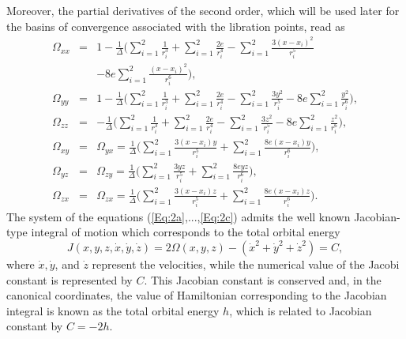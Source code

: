 \documentclass[preprint,fleqn,5p,numbers,sort&compress]{elsarticle}
\begin{document}
Moreover, the partial derivatives of the second order, which will be used later for the  basins of convergence associated with the libration points, read as
\begin{subequations}
\begin{eqnarray}\label{Eq:4a}
\Omega_{xx} &=& 1-\frac{1}{\Delta}\Big(\sum_{i=1}^2\frac{1}{r_i^3}+\sum_{i=1}^2\frac{2e}{r_i^4}-\sum_{i=1}^2\frac{3(x-x_i)^2}{r_i^5}\nonumber\\
  &&-8e\sum_{i=1}^2\frac{(x-x_i)^2}{r_i^6}\Big),\\
\label{Eq:4b}
\Omega_{yy} &=& 1-\frac{1}{\Delta}\Big(\sum_{i=1}^2\frac{1}{r_i^3}+\sum_{i=1}^2\frac{2e}{r_i^4}-\sum_{i=1}^2\frac{3y^2}{r_i^5}-8e\sum_{i=1}^2\frac{y^2}{r_i^6}\Big),\\
\label{Eq:4c}
\Omega_{zz} &=&-\frac{1}{\Delta}\Big(\sum_{i=1}^2\frac{1}{r_i^3}+\sum_{i=1}^2\frac{2e}{r_i^4}-\sum_{i=1}^2\frac{3z^2}{r_i^5}-8e\sum_{i=1}^2\frac{z^2}{r_i^6}\Big),\\
\label{Eq:4d}
\Omega_{xy} &=&\Omega_{yx} =\frac{1}{\Delta}\Big(\sum_{i=1}^2\frac{3(x-x_i)y}{r_i^5}+\sum_{i=1}^2\frac{8e(x-x_i)y}{r_i^6}\Big),\\
\label{Eq:4e}
\Omega_{yz} &=& \Omega_{zy} =\frac{1}{\Delta}\Big(\sum_{i=1}^2\frac{3yz}{r_i^5}+\sum_{i=1}^2\frac{8eyz}{r_i^6}\Big),\\
\label{Eq:4f}
\Omega_{zx} &=&\Omega_{zx}= \frac{1}{\Delta}\Big(\sum_{i=1}^2\frac{3(x-x_i)z}{r_i^5}+\sum_{i=1}^2\frac{8e(x-x_i)z}{r_i^6}\Big).
\end{eqnarray}
\end{subequations}
The system of the equations (\ref{Eq:2a},...,\ref{Eq:2c}) admits the well known Jacobian-type integral of motion which corresponds to the total orbital energy
\begin{equation}\label{Eq:9}
J(x, y, z, \dot{x}, \dot{y}, \dot{z})=2\Omega(x, y, z)-(\dot{x}^2+\dot{y}^2+\dot{z}^2) =C,
\end{equation}
where $\dot{x}, \dot{y}$, and $\dot{z}$  represent the velocities, while the numerical value of the Jacobi constant is represented by $C$. This Jacobian constant is conserved and, in the canonical coordinates, the value of Hamiltonian corresponding to the Jacobian integral is known as the total orbital energy $h$, which is related to Jacobian constant by $C=-2h$.
\end{document}
